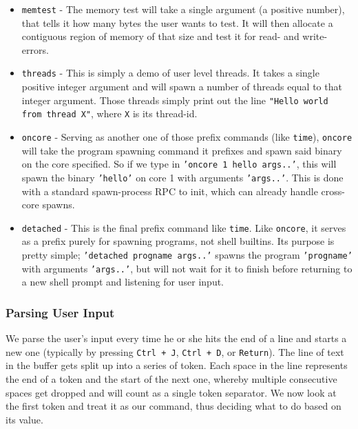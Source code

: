 \begin{itemize}
	\item \texttt{memtest} - The memory test will take a single argument (a 
	positive number), that tells it how many bytes the user wants to test. It 
	will then allocate a contiguous region of memory of that size and test it 
	for read- and write-errors.
	
	\item \texttt{threads} - This is simply a demo of user level threads. It 
	takes a single positive integer argument and will spawn a number of threads 
	equal to that integer argument. Those threads simply print out the line 
	\texttt{"Hello world from thread X"}, where \texttt{X} is its thread-id.
	
	\item \texttt{oncore} - Serving as another one of those prefix commands 
	(like \texttt{time}), \texttt{oncore} will take the program spawning 
	command it prefixes and spawn said binary on the core specified. So if we 
	type in \texttt{'oncore 1 hello args..'}, this will spawn the binary 
	\texttt{'hello'} on core 1 with arguments \texttt{'args..'}. This is done 
	with a standard spawn-process RPC to init, which can already handle 
	cross-core spawns.
	
	\item \texttt{detached} - This is the final prefix command like 
	\texttt{time}. Like \texttt{oncore}, it serves as a prefix purely for 
	spawning programs, not shell builtins. Its purpose is pretty simple; 
	\texttt{'detached progname args..'} spawns the program \texttt{'progname'} 
	with arguments \texttt{'args..'}, but will not wait for it to finish 
	before returning to a new shell prompt and listening for user input.
\end{itemize}

\subsubsection{Parsing User Input}\label{sss:parsing-input}

We parse the user's input every time he or she hits the end of a line and 
starts a new one (typically by pressing \texttt{Ctrl + J}, \texttt{Ctrl + D}, 
or \texttt{Return}). The line of text in the buffer gets split up into a series 
of token. Each space in the line represents the end of a token and the start of 
the next one, whereby multiple consecutive spaces get dropped and will count as 
a single token separator. We now look at the first token and treat it as our 
command, thus deciding what to do based on its value.
\medskip

